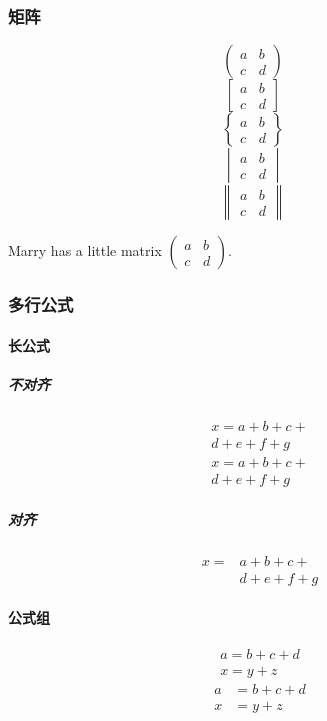 \documentclass[UTF8]{ctexart}
\begin{document}
\subsubsection{矩阵}
\[\begin{pmatrix} a&b\\c&d \end{pmatrix} \quad\]
\[\begin{bmatrix} a&b\\c&d \end{bmatrix} \quad\]
\[\begin{Bmatrix} a&b\\c&d \end{Bmatrix} \quad\]
\[\begin{vmatrix} a&b\\c&d \end{vmatrix} \quad\]
\[\begin{Vmatrix} a&b\\c&d \end{Vmatrix} \quad\]
\newline

Marry has a little matrix $(\begin{smallmatrix} a&b\\c&d \end{smallmatrix})$.

\subsubsection{多行公式}
\paragraph{长公式}
\subparagraph{不对齐}
\begin{multline}
    x = a+b+c+{}\\
    d+e+f+g
    \end{multline}   
\begin{multline*}
    x = a+b+c+{}\\
    d+e+f+g
    \end{multline*}
\subparagraph{对齐}
\[\begin{aligned}
x={}& a+b+c+{}\\
&d+e+f+g
\end{aligned}\]

\paragraph{公式组}
\begin{gather}
a=b+c+d\\
x=y+z
\end{gather}
\begin{align}
a&=b+c+d\\
x&=y+z
\end{align}    
\end{document}
